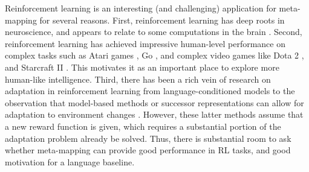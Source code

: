 Reinforcement learning is an interesting (and challenging) application for meta-mapping for several reasons. First, reinforcement learning has deep roots in neuroscience, and appears to relate to some computations in the brain \citep{Sutton2017, Niv2009, Odoherty2003, Dabney2020}. Second, reinforcement learning has achieved impressive human-level performance on complex tasks such as Atari games \citep{Mnih2015}, Go \citep{Silver2016, Silver2017}, and complex video games like Dota 2 \citep{OpenAI2019}, and Starcraft II \citep{Vinyals2019}. This motivates it as an important place to explore more human-like intelligence. Third, there has been a rich vein of research on adaptation in reinforcement learning from language-conditioned models \citep{Hermann2017} to the observation that model-based methods or successor representations can allow for adaptation to environment changes \citep{Daw2014, Momennejad2017}. However, these latter methods assume that a new reward function is given, which requires a substantial portion of the adaptation problem already be solved. Thus, there is substantial room to ask whether meta-mapping can provide good performance in RL tasks, and good motivation for a language baseline. \par 
